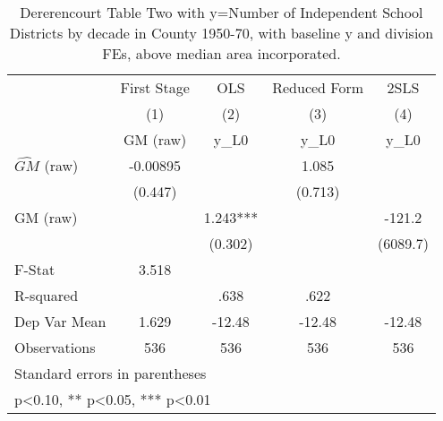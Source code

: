 \begin{table}[htbp]\centering
\def\sym#1{\ifmmode^{#1}\else\(^{#1}\)\fi}
\caption{Dererencourt Table Two with y=Number of Independent School Districts by decade in County 1950-70, with baseline y and division FEs, above median area incorporated.}
\begin{tabular}{l*{4}{c}}
\toprule
                    & First Stage   &         OLS   &Reduced Form   &        2SLS   \\
                    &\multicolumn{1}{c}{(1)}&\multicolumn{1}{c}{(2)}&\multicolumn{1}{c}{(3)}&\multicolumn{1}{c}{(4)}\\
                    &\multicolumn{1}{c}{GM  (raw)}&\multicolumn{1}{c}{y\_L0}&\multicolumn{1}{c}{y\_L0}&\multicolumn{1}{c}{y\_L0}\\
\midrule
$\hat{GM}$ (raw)    &    -0.00895   &               &       1.085   &               \\
                    &     (0.447)   &               &     (0.713)   &               \\
\addlinespace
GM  (raw)           &               &       1.243***&               &      -121.2   \\
                    &               &     (0.302)   &               &    (6089.7)   \\
\midrule
F-Stat              &       3.518   &               &               &               \\
R-squared           &               &        .638   &        .622   &               \\
Dep Var Mean        &       1.629   &      -12.48   &      -12.48   &      -12.48   \\
Observations        &         536   &         536   &         536   &         536   \\
\bottomrule
\multicolumn{5}{l}{\footnotesize Standard errors in parentheses}\\
\multicolumn{5}{l}{\footnotesize * p<0.10, ** p<0.05, *** p<0.01}\\
\end{tabular}
\end{table}
